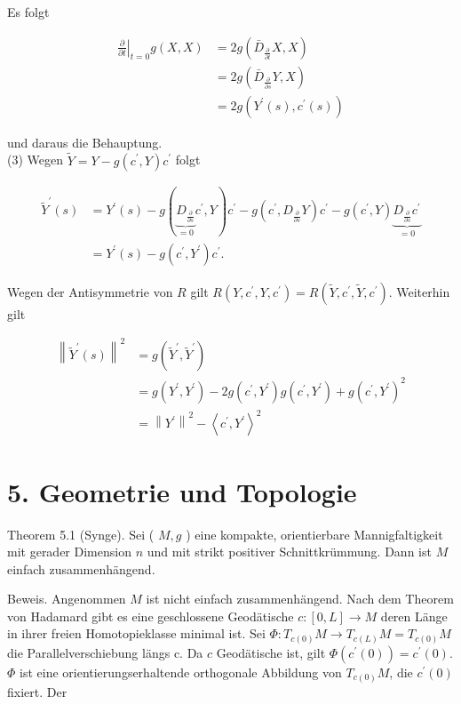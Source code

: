 \documentclass[10pt, letterpaper]{article}
\begin{document}
Es folgt

$$
\begin{aligned}
\left.\frac{\partial}{\partial t}\right|_{t=0} g(X, X) & =2 g\left(\bar{D}_{\frac{\partial}{\partial t}} X, X\right) \\
& =2 g\left(\bar{D}_{\frac{\partial}{\partial s}} Y, X\right) \\
& =2 g\left(Y^{\prime}(s), c^{\prime}(s)\right)
\end{aligned}
$$

und daraus die Behauptung.\\
(3) Wegen $\tilde{Y}=Y-g\left(c^{\prime}, Y\right) c^{\prime}$ folgt

$$
\begin{aligned}
\tilde{Y}^{\prime}(s) & =Y^{\prime}(s)-g(\underbrace{D_{\frac{\partial}{\partial s}}}_{=0} c^{\prime}, Y) c^{\prime}-g\left(c^{\prime}, D_{\frac{\partial}{\partial s}} Y\right) c^{\prime}-g\left(c^{\prime}, Y\right) \underbrace{D_{\frac{\partial}{\partial s}} c^{\prime}}_{=0} \\
& =Y^{\prime}(s)-g\left(c^{\prime}, Y^{\prime}\right) c^{\prime} .
\end{aligned}
$$

Wegen der Antisymmetrie von $R$ gilt $R\left(Y, c^{\prime}, Y, c^{\prime}\right)=R\left(\tilde{Y}, c^{\prime}, \tilde{Y}, c^{\prime}\right)$. Weiterhin gilt

$$
\begin{aligned}
\left\|\tilde{Y}^{\prime}(s)\right\|^{2} & =g\left(\tilde{Y}^{\prime}, \tilde{Y}^{\prime}\right) \\
& =g\left(Y^{\prime}, Y^{\prime}\right)-2 g\left(c^{\prime}, Y^{\prime}\right) g\left(c^{\prime}, Y^{\prime}\right)+g\left(c^{\prime}, Y^{\prime}\right)^{2} \\
& =\left\|Y^{\prime}\right\|^{2}-\left\langle c^{\prime}, Y^{\prime}\right\rangle^{2}
\end{aligned}
$$

\section*{5. Geometrie und Topologie}
Theorem 5.1 (Synge). Sei ( $M, g$ ) eine kompakte, orientierbare Mannigfaltigkeit mit gerader Dimension $n$ und mit strikt positiver Schnittkrümmung. Dann ist $M$ einfach zusammenhängend.

Beweis. Angenommen $M$ ist nicht einfach zusammenhängend. Nach dem Theorem von Hadamard gibt es eine geschlossene Geodätische $c:[0, L] \rightarrow M$ deren Länge in ihrer freien Homotopieklasse minimal ist. Sei $\Phi: T_{c(0)} M \rightarrow T_{c(L)} M=T_{c(0)} M$ die Parallelverschiebung längs c. Da $c$ Geodätische ist, gilt $\Phi\left(c^{\prime}(0)\right)=c^{\prime}(0)$. $\Phi$ ist eine orientierungserhaltende orthogonale Abbildung von $T_{c(0)} M$, die $c^{\prime}(0)$ fixiert. Der
\end{document}
